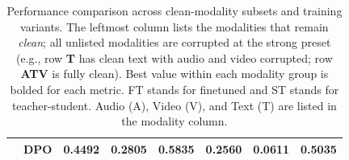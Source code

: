 \begin{table}[t]
\begin{tabular}{llcccccc}
& DPO & 0.4492 & 0.2805 & 0.5835 & 0.2560 & 0.0611 & 0.5035\\
\bottomrule
\end{tabular}
\caption{Performance comparison across clean-modality subsets and training variants. The leftmost column lists the modalities that remain \emph{clean}; all unlisted modalities are corrupted at the strong preset (e.g., row \textbf{T} has clean text with audio and video corrupted; row \textbf{ATV} is fully clean). Best value within each modality group is bolded for each metric. FT stands for finetuned and ST stands for teacher-student. Audio (A), Video (V), and Text (T) are listed in the modality column.}
\label{tab:corrupt-strong-student-teacher-weighted}
\end{table}
